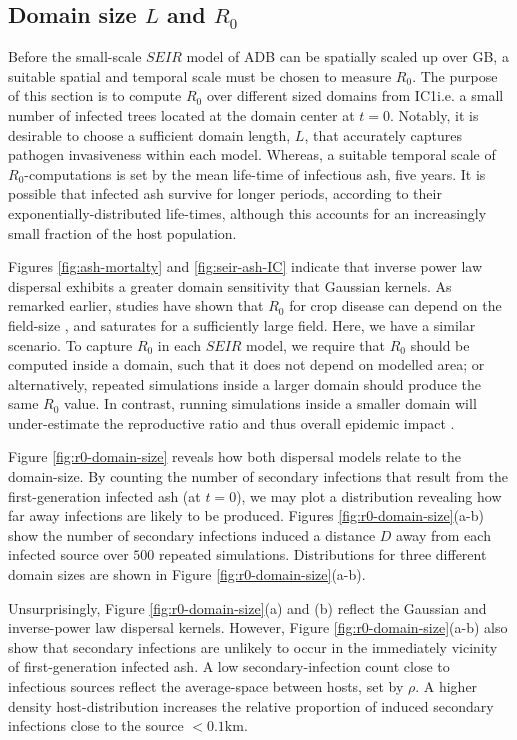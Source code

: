 \subsection{Domain size $L$ and $R_0$}
\label{sec:r0-vs-L}

Before the small-scale $SEIR$ model of ADB can be spatially scaled up over GB, a suitable spatial and temporal scale must be chosen to measure $R_0$.
The purpose of this section is to compute $R_0$ over different sized domains from IC1\textemdash i.e. a small number of infected trees located at the domain center at $t=0$.
Notably, it is desirable to choose a sufficient domain length, $L$, that accurately captures pathogen invasiveness within each model.
Whereas, a suitable temporal scale of $R_0$-computations is set by the mean life-time of infectious ash, five years.
It is possible that infected ash survive for longer periods, according to their exponentially-distributed life-times, although this accounts for an increasingly small fraction of the host population.

Figures \ref{fig:ash-mortalty} and \ref{fig:seir-ash-IC} indicate that inverse power law dispersal exhibits a greater domain sensitivity that Gaussian kernels.
As remarked earlier, studies have shown that $R_0$ for crop disease can depend on the field-size \cite{mikaberidze2016invasiveness}, and saturates for a sufficiently large field.
Here, we have a similar scenario.
To capture $R_0$ in each $SEIR$ model, we require that $R_0$ should be computed inside a domain, such that it does not depend on modelled area;
or alternatively, repeated simulations inside a larger domain should produce the same $R_0$ value.
In contrast, running simulations inside a smaller domain will under-estimate the reproductive ratio and thus overall epidemic impact \cite{R0-perc-ref, time-varying-infectivity}.

Figure \ref{fig:r0-domain-size} reveals how both dispersal models relate to the domain-size.
By counting the number of secondary infections that result from the first-generation infected ash (at $t=0$), we may plot a distribution revealing how far away infections are likely to be produced.
Figures \ref{fig:r0-domain-size}(a-b) show the number of secondary infections induced a distance $D$ away from each infected source over $500$ repeated simulations.
Distributions for three different domain sizes are shown in Figure \ref{fig:r0-domain-size}(a-b).

Unsurprisingly, Figure \ref{fig:r0-domain-size}(a) and (b) reflect the Gaussian and inverse-power law dispersal kernels. 
However, Figure \ref{fig:r0-domain-size}(a-b) also show that secondary infections are unlikely to occur in the immediately vicinity of first-generation infected ash.
A low secondary-infection count close to infectious sources reflect the average-space between hosts, set by $\rho$.
A higher density host-distribution increases the relative proportion of induced secondary infections close to the source $<0.1\mathrm{km}$.

